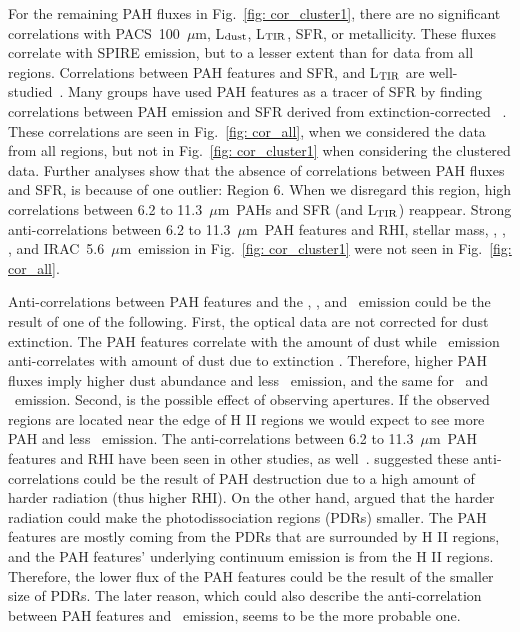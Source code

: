        For the remaining PAH fluxes in Fig.~\ref{fig: cor_cluster1}, there are no significant correlations with PACS~100~$\mu$m, L$_{\rm dust}$, L$_{\rm TIR}$, SFR, or metallicity.
        These fluxes correlate with SPIRE emission, but to a lesser extent than for data from all regions.
        Correlations between PAH features and SFR, and L$_{\rm TIR}$ are well-studied~\citep[e.g.][]{Tielens08,Peeters04}. 
        Many groups have used PAH features as a tracer of SFR by finding correlations between 
        PAH emission and SFR derived from extinction-corrected \halpha~\citep[e.g.][]{Shipley16,Khramtsova13,Calzetti07}.
        These correlations are seen in Fig.~\ref{fig: cor_all}, when we considered the data from all regions, but not in Fig.~\ref{fig: cor_cluster1} when considering the clustered data.
        Further analyses show that the absence of correlations between PAH fluxes and SFR, is because of one outlier: Region 6. 
        When we disregard this region, high correlations between 6.2 to 11.3~$\mu$m~PAHs and SFR (and L$_{\rm TIR}$) reappear.
        Strong anti-correlations between 6.2 to 11.3~$\mu$m~PAH features and RHI, stellar mass, \halpha, \sii, \oiii, and IRAC~5.6~$\mu$m~emission in Fig.~\ref{fig: cor_cluster1} were not seen in Fig.~\ref{fig: cor_all}.
     
        Anti-correlations between PAH features and the \halpha, \sii, and \oiii~emission could be the result of one of the following. 
        First, the optical data are not corrected for dust extinction.
        The PAH features correlate with the amount of dust while \halpha~emission anti-correlates with amount of dust due to extinction \citep{Calzetti94}.
        Therefore, higher PAH fluxes imply higher dust abundance and less \halpha~emission, and the same for \sii~and \oiii~emission.
        Second, is the possible effect of observing apertures.
        If the observed regions are located near the edge of H {\sc II} regions we would expect to see more PAH and less \halpha~emission. %
        The anti-correlations between 6.2 to 11.3~$\mu$m~PAH features and RHI have been seen in other studies, as well~\citep[e.g.][]{Dim15, Gordon08, Wu06}.
        \cite{Wu06} suggested these anti-correlations could be the result of PAH destruction due to a high amount of harder radiation (thus higher RHI).
        On the other hand, \cite{Gordon08} argued that the harder radiation could make the photodissociation regions (PDRs) smaller.
        The PAH features are mostly coming from the PDRs that are surrounded by H {\sc II} regions, and the PAH features' underlying continuum emission is from the H {\sc II} regions.
        Therefore, the lower flux of the PAH features could be the result of the smaller size of PDRs.
        The later reason, which could also describe the anti-correlation between PAH features and \halpha~emission, seems to be the more probable one. 
        
